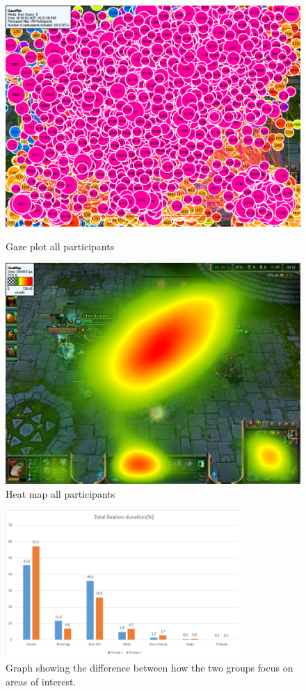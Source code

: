 \documentclass[notitlepage]{report}
\begin{document}
\begin{figure}[ht]
\begin{minipage}[b]{0.45\linewidth}
\centering
\includegraphics[width=\textwidth]{images/gazeplot/All}
\caption{Gaze plot all participants}
\label{gaze_all}
\end{minipage}
\hspace{0.5cm}
\begin{minipage}[b]{0.45\linewidth}
\centering
\includegraphics[width=\textwidth]{images/heatmap/All}
\caption{Heat map all participants}
\label{heat_all}
\end{minipage}
\end{figure}

\begin{figure}[h]
\centering
\includegraphics[width=0.8\textwidth]{images/AOIChart}
\caption{Graph showing the difference between how the two groups focus on areas of interest.}
\label{aoi_graph}
\end{figure}
\end{document}
